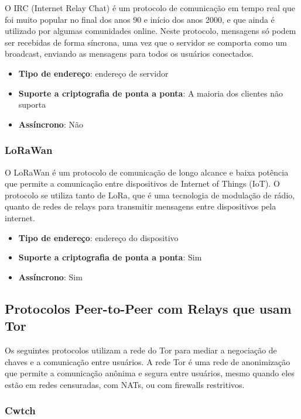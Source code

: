 O IRC (Internet Relay Chat) é um protocolo de comunicação em tempo real que foi muito popular no final dos anos 90 e início dos anos 2000, e que ainda é utilizado por algumas comunidades online. Neste protocolo, mensagens só podem ser recebidas de forma síncrona, uma vez que o servidor se comporta como um broadcast, enviando as mensagens para todos os usuários conectados. \cite{rfc2810}

\begin{itemize}
  \item \textbf{Tipo de endereço}: endereço de servidor
  \item \textbf{Suporte a criptografia de ponta a ponta}: A maioria dos clientes não suporta
  \item \textbf{Assíncrono}: Não
\end{itemize}

\subsubsection{LoRaWan}

O LoRaWan é um protocolo de comunicação de longo alcance e baixa potência que permite a comunicação entre dispositivos de Internet of Things (IoT). O protocolo se utiliza tanto de LoRa, que é uma tecnologia de modulação de rádio, quanto de redes de relays para transmitir mensagens entre dispositivos pela internet. \cite{lorawan}

\begin{itemize}
  \item \textbf{Tipo de endereço}: endereço do dispositivo
  \item \textbf{Suporte a criptografia de ponta a ponta}: Sim
  \item \textbf{Assíncrono}: Sim
\end{itemize}

\subsection{Protocolos Peer-to-Peer com Relays que usam Tor}

Os seguintes protocolos utilizam a rede do Tor para mediar a negociação de chaves e a comunicação entre usuários. A rede Tor é uma rede de anonimização que permite a comunicação anônima e segura entre usuários, mesmo quando eles estão em redes censuradas, com NATs, ou com firewalls restritivos.

\subsubsection{Cwtch}

